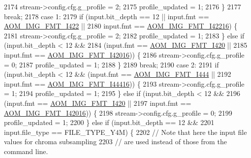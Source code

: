 \begin{DoxyCodeInclude}
{{{{{{{{{{{{{{{{{{{{{{{{{{{{{{{{{{{{{{{{{{{{{{{{{{{2174               stream->config.cfg.g\_profile = 2;
2175               profile\_updated = 1;
2176             \}
2177             \textcolor{keywordflow}{break};
2178           \textcolor{keywordflow}{case} 1:
2179             \textcolor{keywordflow}{if} (input.bit\_depth == 12 || input.fmt == \hyperlink{aom__image_8h_a930317c04b4bd0a660bb5e744055523cab2f75281e94ebc0f0bc728ef287cd3e8}{AOM\_IMG\_FMT\_I422} ||
2180                 input.fmt == \hyperlink{aom__image_8h_a930317c04b4bd0a660bb5e744055523ca064683ed4260fc6244af6cfc9d261c22}{AOM\_IMG\_FMT\_I42216}) \{
2181               stream->config.cfg.g\_profile = 2;
2182               profile\_updated = 1;
2183             \} \textcolor{keywordflow}{else} \textcolor{keywordflow}{if} (input.bit\_depth < 12 &&
2184                        (input.fmt == \hyperlink{aom__image_8h_a930317c04b4bd0a660bb5e744055523cabd778a3d697463e89d12a1117f417b60}{AOM\_IMG\_FMT\_I420} ||
2185                         input.fmt == \hyperlink{aom__image_8h_a930317c04b4bd0a660bb5e744055523ca20a9cf30277260685642b4cfb4e9273b}{AOM\_IMG\_FMT\_I42016})) \{
2186               stream->config.cfg.g\_profile = 0;
2187               profile\_updated = 1;
2188             \}
2189             \textcolor{keywordflow}{break};
2190           \textcolor{keywordflow}{case} 2:
2191             \textcolor{keywordflow}{if} (input.bit\_depth < 12 && (input.fmt == \hyperlink{aom__image_8h_a930317c04b4bd0a660bb5e744055523ca89d423506e948ab7d3b98b5750b92655}{AOM\_IMG\_FMT\_I444} ||
2192                                          input.fmt == \hyperlink{aom__image_8h_a930317c04b4bd0a660bb5e744055523cab9b93d397dedbdd6bfafec84d1f8f0f5}{AOM\_IMG\_FMT\_I44416})) \{
2193               stream->config.cfg.g\_profile = 1;
2194               profile\_updated = 1;
2195             \} \textcolor{keywordflow}{else} \textcolor{keywordflow}{if} (input.bit\_depth < 12 &&
2196                        (input.fmt == \hyperlink{aom__image_8h_a930317c04b4bd0a660bb5e744055523cabd778a3d697463e89d12a1117f417b60}{AOM\_IMG\_FMT\_I420} ||
2197                         input.fmt == \hyperlink{aom__image_8h_a930317c04b4bd0a660bb5e744055523ca20a9cf30277260685642b4cfb4e9273b}{AOM\_IMG\_FMT\_I42016})) \{
2198               stream->config.cfg.g\_profile = 0;
2199               profile\_updated = 1;
2200             \} \textcolor{keywordflow}{else} \textcolor{keywordflow}{if} (input.bit\_depth == 12 &&
2201                        input.file\_type == FILE\_TYPE\_Y4M) \{
2202               \textcolor{comment}{// Note that here the input file values for chroma subsampling}
2203               \textcolor{comment}{// are used instead of those from the command line.}
}}}}}}}}}}}}}}}}}}}}}}}}}}}}}}}}}}}}}}}}}}}}}}}}}}}
\end{DoxyCodeInclude}
